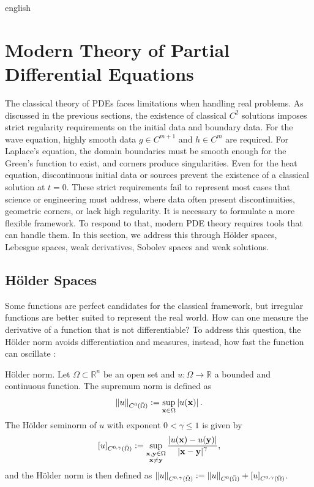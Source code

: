 \begin{hyphenrules}{english}
\section{Modern Theory of Partial Differential Equations}\label{sec:modern-theory}

The classical theory of PDEs faces limitations when handling real problems. As discussed in the
previous sections, the existence of classical $C^2$ solutions imposes strict regularity requirements on
the initial data and boundary data. For the wave equation, highly smooth data $g\in C^{m+1}$ and
$h\in C^m$ are required. For Laplace's equation, the domain boundaries must be smooth enough for the
Green's function to exist, and corners produce singularities. Even for the heat equation, discontinuous
initial data or sources prevent the existence of a classical solution at $t=0$. These strict
requirements fail to represent most cases that science or engineering must address, where data often
present discontinuities, geometric corners, or lack high regularity. It is necessary to formulate a more
flexible framework. To respond to that, modern PDE theory requires tools that can handle them. In this
section, we address this through Hölder spaces, Lebesgue spaces, weak derivatives, Sobolev spaces and
weak solutions.

\subsection{Hölder Spaces}\label{subsec:holder}

Some functions are perfect candidates for the classical framework, but irregular functions are better
suited to represent the real world. How can one measure the derivative of a function that is not
differentiable? To address this question, the Hölder norm avoids differentiation and measures, instead,
how fast the function can oscillate \cite{evans2010}:

\begin{definicion}{Hölder norm.}\label{def:holder-norm}
Let $\Omega\subset\mathbb{R}^n$ be an open set and $u:\Omega\to\mathbb{R}$ a bounded and continuous function. The
supremum norm is defined as
\[
  \left\lVert u \right\rVert_{C^0(\bar\Omega)}:=\sup_{\mathbf{x}\in\Omega}\left\lvert u(\mathbf{x}) \right\rvert.
\]
The Hölder seminorm of $u$ with exponent $0<\gamma\le1$ is given by
\[
  [u]_{C^{0,\gamma}(\bar\Omega)}:=\sup_{\substack{\mathbf{x},\mathbf{y}\in\Omega\\ \mathbf{x}\neq\mathbf{y}}}
  \frac{\left\lvert u(\mathbf{x})-u(\mathbf{y}) \right\rvert}{\left\lvert \mathbf{x}-\mathbf{y} \right\rvert^{\gamma}},
\]
and the Hölder norm is then defined as
$\left\lVert u \right\rVert_{C^{0,\gamma}(\bar\Omega)}:=\left\lVert u \right\rVert_{C^0(\bar\Omega)}+[u]_{C^{0,\gamma}(\bar\Omega)}$.
\end{definicion}


\end{hyphenrules}
